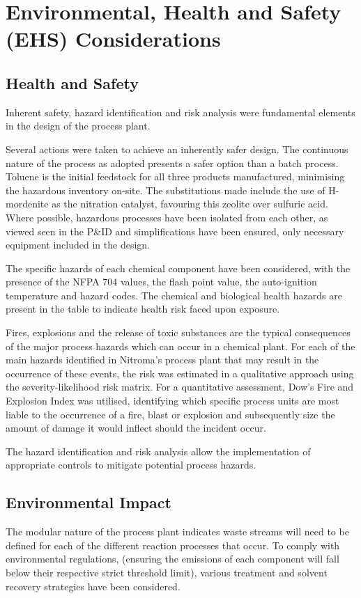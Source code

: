 \section{Environmental, Health and Safety (EHS) Considerations}
\label{sec:ehs}
\subsection{Health and Safety}

Inherent safety, hazard identification and risk analysis were fundamental elements in the design of the process plant. 

Several actions were taken to achieve an inherently safer design. The continuous nature of the process as adopted presents a safer option than a batch process. Toluene is the initial feedstock for all three products manufactured, minimising the hazardous inventory on-site. The substitutions made include the use of H-mordenite as the nitration catalyst, favouring this zeolite over sulfuric acid. Where possible, hazardous processes have been isolated from each other, as viewed seen in the P&ID and simplifications have been ensured, only necessary equipment included in the design. 

The specific hazards of each chemical component have been considered, with the presence of the NFPA 704 values, the flash point value, the auto-ignition temperature and hazard codes. The chemical and biological health hazards are present in the table to indicate health risk faced upon exposure.  

Fires, explosions and the release of toxic substances are the typical consequences of the major process hazards which can occur in a chemical plant. For each of the main hazards identified in Nitroma's process plant that may result in the occurrence of these events, the risk was estimated in a qualitative approach using the severity-likelihood risk matrix. For a quantitative assessment, Dow's Fire and Explosion Index was utilised, identifying which specific process units are most liable to the occurrence of a fire, blast or explosion and subsequently size the amount of damage it would inflect should the incident occur. 

The hazard identification and risk analysis allow the implementation of appropriate controls to mitigate potential process hazards. 


\subsection{Environmental Impact}

The modular nature of the process plant indicates waste streams will need to be defined for each of the different reaction processes that occur. To comply with environmental regulations, (ensuring the emissions of each component will fall below their respective strict threshold limit), various treatment and solvent recovery strategies have been considered. 